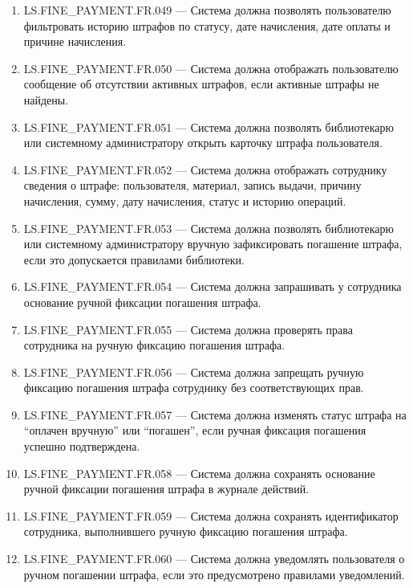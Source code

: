 \documentclass[12pt,a4paper]{article}
\begin{document}
\begin{enumerate}
		\item LS.FINE\_PAYMENT.FR.049 --- Система должна позволять пользователю фильтровать историю
		штрафов по статусу, дате начисления, дате оплаты и причине начисления.
		
		\item LS.FINE\_PAYMENT.FR.050 --- Система должна отображать пользователю сообщение об
		отсутствии активных штрафов, если активные штрафы не найдены.
		
		\item LS.FINE\_PAYMENT.FR.051 --- Система должна позволять библиотекарю или системному
		администратору открыть карточку штрафа пользователя.
		
		\item LS.FINE\_PAYMENT.FR.052 --- Система должна отображать сотруднику сведения о штрафе:
		пользователя, материал, запись выдачи, причину начисления, сумму, дату начисления,
		статус и историю операций.
		
		\item LS.FINE\_PAYMENT.FR.053 --- Система должна позволять библиотекарю или системному
		администратору вручную зафиксировать погашение штрафа, если это допускается
		правилами библиотеки.
		
		\item LS.FINE\_PAYMENT.FR.054 --- Система должна запрашивать у сотрудника основание ручной
		фиксации погашения штрафа.
		
		\item LS.FINE\_PAYMENT.FR.055 --- Система должна проверять права сотрудника на ручную
		фиксацию погашения штрафа.
		
		\item LS.FINE\_PAYMENT.FR.056 --- Система должна запрещать ручную фиксацию погашения
		штрафа сотруднику без соответствующих прав.
		
		\item LS.FINE\_PAYMENT.FR.057 --- Система должна изменять статус штрафа на ``оплачен вручную''
		или ``погашен'', если ручная фиксация погашения успешно подтверждена.
		
		\item LS.FINE\_PAYMENT.FR.058 --- Система должна сохранять основание ручной фиксации
		погашения штрафа в журнале действий.
		
		\item LS.FINE\_PAYMENT.FR.059 --- Система должна сохранять идентификатор сотрудника,
		выполнившего ручную фиксацию погашения штрафа.
		
		\item LS.FINE\_PAYMENT.FR.060 --- Система должна уведомлять пользователя о ручном погашении
		штрафа, если это предусмотрено правилами уведомлений.
		

\end{enumerate}
\end{document}
